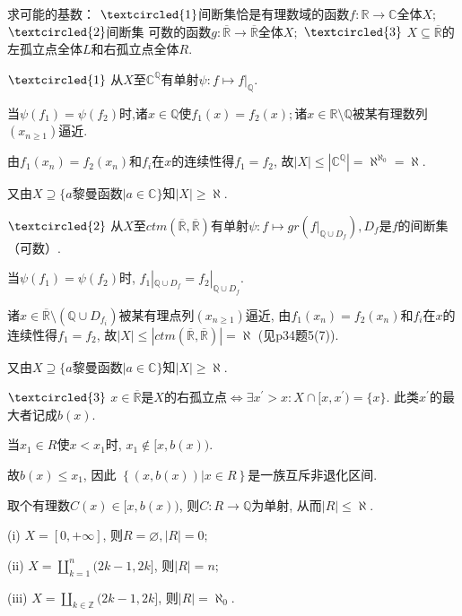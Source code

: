 \begin{10}
求可能的基数：
$\textcircled{1}$间断集恰是有理数域的函数$f:\mathbb{R}\to\mathbb{C}$全体$X;$
$\textcircled{2}$间断集
可数的函数$g:\overline{\mathbb{R}}\to\overline{\mathbb{R}}$全体$X;$
$\textcircled{3}$ $X\subseteq\overline{\mathbb{R}}$的左孤立点全体$L$和右孤立点全体$R.$
\end{10}   
\begin{solution}

$\textcircled{1}$ 从$X$至$\mathbb{C}^{\mathbb{Q}}$有单射$\psi :f\mapsto f|_{\mathbb{Q}}.$

当$\psi(f_1)=\psi(f_2)$时,诸$x\in\mathbb{Q}$使$f_1(x)=f_2(x);$诸$x\in \mathbb{R}\setminus\mathbb{Q}$被某有理数列$(x_{n\geqslant 1})$逼近.

由$f_1(x_n)=f_2(x_n)$和$f_i$在$x$的连续性得$f_1=f_2$, 故$|X|\leqslant |\mathbb{C}^{\mathbb{Q}}|=\aleph^{\aleph_0}=\aleph$.

又由$X\supseteq\{a$黎曼函数$|a\in \mathbb{C}\}$知$|X|\geqslant \aleph$.

$\textcircled{2}$ 从$X$至$ctm(\overline{\mathbb{R}},\overline{\mathbb{R}}) $有单射$\psi:f\mapsto gr(f|_{\mathbb{Q}\cup D_f}),D_f$是$f$的间断集（可数）.

当$\psi(f_1)=\psi(f_2)$时, $f_1|_{\mathbb{Q}\cup D_f}=f_2|_{\mathbb{Q}\cup D_f}.$

诸$x\in \overline{\mathbb{R}}\setminus(\mathbb{Q}\cup D_{f_i}) $被某有理点列$(x_{n\geqslant1})$逼近,
由$f_1(x_n)=f_2(x_n)$和$f_i$在$x$的连续性得$f_1=f_2$,
故$|X|\leqslant|ctm(\overline{\mathbb{R}},\overline{\mathbb{R}})|=\aleph$ (见p34题5(7)).

又由$X\supseteq\{a$黎曼函数$|a\in \mathbb{C}\}$知$|X|\geqslant \aleph.$

$\textcircled{3}$ $x\in\overline{\mathbb{R}}$是$X$的右孤立点$\iff\exists x^\prime>x:X\cap[x,x^{\prime})=\{x\}.$
此类$x^{\prime}$的最大者记成$b(x)$.

当$x_1\in R$使$ x<x_1$时, $x_1 \notin [x,b(x))$.

故$b(x)\leqslant x_1$, 因此 $\left\{(x,b(x))|x\in R\right\}$是一族互斥非退化区间.

取个有理数$C(x)\in[x,b(x))$, 则$C:R\rightarrow\mathbb{Q}$为单射, 从而$|R|\leqslant \aleph$.

(i) $X=[0,+\infty]$, 则$R=\varnothing ,|R|=0;$

(ii) $X=\coprod\limits_{k=1}^n(2k-1,2k]$, 则$|R|=n;$

(iii) $X=\coprod\limits_{k\in\mathbb{Z}}(2k-1,2k]$, 则$|R|=\aleph_0.$
\end{solution}

